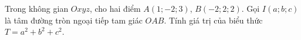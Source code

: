 \begin{ex}
Trong không gian $Oxyz$, cho hai điểm $A(1;-2;3)$, $B(-2;2;2)$. Gọi $I(a;b;c)$ là tâm đường tròn ngoại tiếp tam giác $OAB$. Tính giá trị của biểu thức $T=a^2+b^2+c^2$.
\end{ex}
